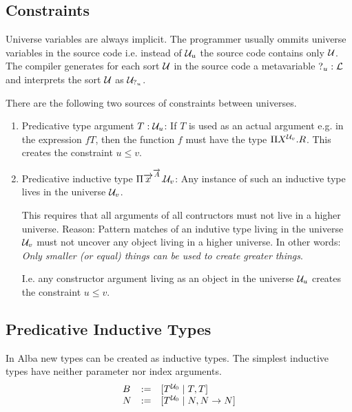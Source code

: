 \subsection{Constraints}


Universe variables are always implicit. The programmer usually ommits universe
variables in the source code i.e. instead of ${\mathcal U}_u$ the source code contains
only ${\mathcal U}$. The compiler generates for each sort ${\mathcal U}$ in the source code a
metavariable ${?_{u}} : {\mathcal L}$ and interprets the sort ${\mathcal U}$ as ${\mathcal U}_{{?_{u}}}$.

There are the following two sources of constraints between universes.

\begin{enumerate}
    \item Predicative type argument $T: {\mathcal U}_{u}$: If $T$ is used as an actual
        argument e.g. in the expression $f T$, then the function $f$ must have
        the type $\Pi X^{{\mathcal U}_v}. R$.  This creates the constraint $u \le v$.

    \item Predicative inductive type $\Pi {\overrightarrow {x}}^{{\overrightarrow {A}}}. {\mathcal U}_{v}$: Any
        instance of such an inductive type lives in the universe ${\mathcal U}_{v}$.

        This requires that all arguments of all contructors must not live in a
        higher universe. Reason: Pattern matches of an indutive type living in
        the universe ${\mathcal U}_{v}$ must not uncover any object living in a
        higher universe. In other words: \emph{Only smaller (or equal) things
        can be used to create greater things}.

        I.e. any constructor argument living as an object in the universe
        ${\mathcal U}_u$ creates the constraint $u \le v$.
\end{enumerate}






\subsection{Predicative Inductive Types}

In Alba new types can be created as inductive types. The simplest inductive
types have neither parameter nor index arguments.
$$
\begin{array}{lll}
    B &:=& [T^{{\mathcal U}_0} \mid T, T]
    \\
    N &:=& [T^{{\mathcal U}_0} \mid N, N \to N]
\end{array}
$$

